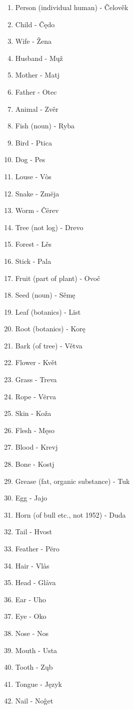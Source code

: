 \begin{multicols}{2}
\begin{enumerate}
	\item Person (individual human) - Čelověk
	\item Child - Čędo
	\item Wife - Žena
	\item Husband - Mųž
	\item Mother - Matj
	\item Father - Otec
	\item Animal - Zvěr
	\item Fish (noun) - Ryba
	\item Bird - Ptica
	\item Dog - Pes
	\item Louse - Vòs
	\item Snake - Zmëja
	\item Worm - Čërev
	\item Tree (not log) - Drevo
	\item Forest - Lěs
	\item Stick - Pala
	\item Fruit (part of plant) - Ovoč
	\item Seed (noun) - Sěmę
	\item Leaf (botanics) - Lïst
	\item Root (botanics) - Korę
	\item Bark (of tree) - Větva
	\item Flower - Květ
	\item Grass - Treva
	\item Rope - Vërva
	\item Skin - Koža
	\item Flesh - Męso
	\item Blood - Krevj
	\item Bone - Kostj
	\item Grease (fat, organic substance) - Tuk
	\item Egg - Jajo
	\item Horn (of bull etc., not 1952) - Duda
	\item Tail - Hvost
	\item Feather - Përo
	\item Hair - Vlås
	\item Head - Glåva
	\item Ear - Uho
	\item Eye - Oko
	\item Nose - Nos
	\item Mouth - Usta
	\item Tooth - Zųb
	\item Tongue - Język
	\item Nail - Noĝet

\end{enumerate}
\end{multicols}
